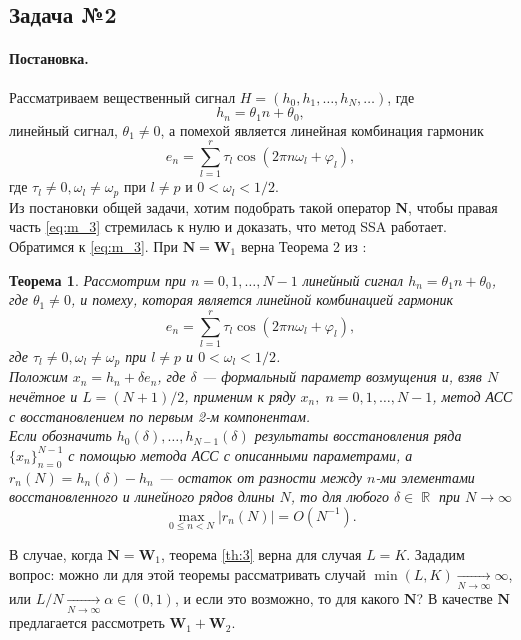 \documentclass[specialist,
               substylefile = spbu_report.rtx,
               subf,href,colorlinks=true, 12pt]{disser}
\DeclareMathOperator\R{\mathbb{R}}
\newtheorem{theorem}{Теорема}
\newenvironment{statement}{\paragraph{Постановка.}}{\hfill}
\begin{document}
\subsection{Задача №2}
\begin{statement}
Рассматриваем вещественный сигнал $H = (h_0, h_1, \dots, h_N, \dots)$, где 
\begin{equation*}
	h_n = \theta_1n+\theta_0,
\end{equation*}
линейный сигнал, $\theta_1\neq0$, а помехой является линейная комбинация гармоник
\begin{equation*}
	e_n = \sum^r_{l=1}\tau_l\cos(2\pi n\omega_l + \varphi_l),
\end{equation*} 
где $\tau_l\neq0, \omega_l \neq \omega_p$ при $l\neq p$ и $0 < \omega_l < 1/2$.
\\Из постановки общей задачи, хотим подобрать такой оператор $\mathbf{N}$, чтобы правая часть \eqref{eq:m_3} стремилась к нулю и доказать, что метод SSA работает.
\\Обратимся к \eqref{eq:m_3}. При $\mathbf{N} = \mathbf{W}_1$ верна Теорема 2 из \cite{ZNekrutkin}:
\begin{theorem}\label{th:3}
	Рассмотрим при $n=0,1,\dots,N-1$ линейный сигнал $h_n = \theta_1n+\theta_0$, где $\theta_1 \neq 0$, и помеху, которая является линейной комбинацией гармоник
	\begin{equation*}
		e_n = \sum^r_{l=1}\tau_l\cos(2\pi n\omega_l + \varphi_l),
	\end{equation*} 
	\emph{где} $\tau_l\neq0, \omega_l \neq \omega_p$ \emph{при} $l\neq p$ и $0 < \omega_l < 1/2$.\\
	Положим $x_n = h_n + \delta e_n$, где $\delta$ --- формальный параметр возмущения и, взяв $N$ нечётное и $L = (N+1)/2$, применим к ряду $x_n,\; n=0,1,\dots, N-1$, метод АСС с восстановлением по первым 2-м компонентам.\\
	Если обозначить $h_0(\delta),\dots, h_{N-1}(\delta)$ результаты восстановления ряда $\{x_n\}^{N-1}_{n=0}$ с помощью метода АСС с описанными параметрами, а $r_n(N)=h_n(\delta)-h_n$ --- остаток от разности между $n$-ми элементами восстановленного и линейного рядов длины $N$, то для любого $\delta\in\R$ при $N\rightarrow\infty$
	\begin{equation*}
		\max_{0\leqslant n<N}|r_n(N)|=O(N^{-1}).
	\end{equation*}
\end{theorem}
В случае, когда $\mathbf{N} = \mathbf{W}_1$, теорема \eqref{th:3} верна для случая $L=K$. Зададим вопрос: можно ли для этой теоремы рассматривать случай $\min(L,K)\underset{N\rightarrow\infty}{\longrightarrow}\infty$, или $L/N\underset{N\rightarrow\infty}{\longrightarrow}\alpha\in(0,1)$, и если это возможно, то для какого $\mathbf{N}$? В качестве $\mathbf{N}$ предлагается рассмотреть $\mathbf{W}_1 + \mathbf{W}_2$. 
\end{statement}
\end{document}
